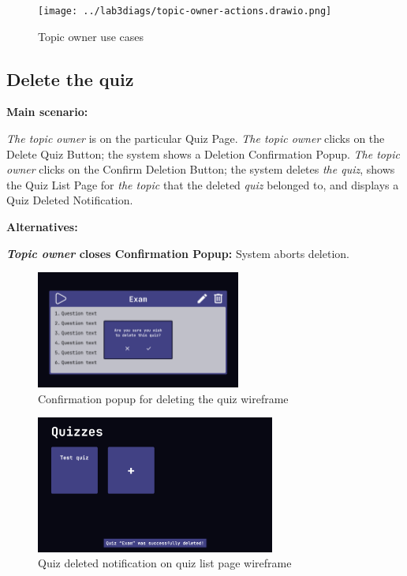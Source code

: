 \documentclass[
    english, %
]{VUMIFPSkursinis}
\begin{document}
\pagebreak

\begin{figure}[ht]
    \centering
    \texttt{[image: ../lab3diags/topic-owner-actions.drawio.png]}
    \caption{Topic owner use cases}
    \label{topic-owner}
\end{figure}

\subsection{Delete the quiz}

\noindent\textbf{\fontsize{13}{15}\selectfont Main scenario:}

\textit{The topic owner} is on the particular Quiz Page. \textit{The topic owner} clicks on the Delete Quiz Button; the system shows a Deletion Confirmation Popup. \textit{The topic owner} clicks on the Confirm Deletion Button; the system deletes \textit{the quiz}, shows the Quiz List Page for \textit{the topic} that the deleted \textit{quiz} belonged to, and displays a Quiz Deleted Notification.

\noindent\textbf{\fontsize{13}{15}\selectfont Alternatives:}

\textbf{\textit{Topic owner} closes Confirmation Popup:} System aborts deletion.

\begin{figure}[ht]
    \centering
    \includegraphics[width=0.6\textwidth]{../lab3diags/Quiz delete popup.png}
    \caption{Confirmation popup for deleting the quiz wireframe}
    \label{wireframe-quiz-delete-popup}
\end{figure}

\pagebreak

\begin{figure}[ht]
    \centering
    \includegraphics[width=0.7\textwidth]{../lab3diags/Quiz list after deletion.png}
    \caption{Quiz deleted notification on quiz list page wireframe}
    \label{wireframe-quiz-delete-popup-notification}
\end{figure}
\end{document}

